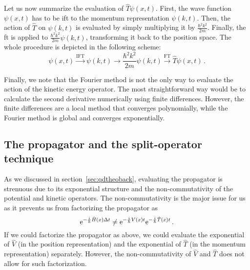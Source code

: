 Let us now summarize the evaluation of $\hat{T}\psi(x,t)$. First, the wave function $\psi(x,t)$ has to be \acrshort{ift} to the momentum representation $\psi(k,t)$. Then, the action of $\hat{T}$ on $\psi(k,t)$ is evaluated by simply multiplying it by $\frac{\hbar^2 k^2}{2m}$. Finally, the \acrshort{ft} is applied to $\frac{\hbar^2 k^2}{2m} \psi(k,t)$, transforming it back to the position space. The whole procedure is depicted in the following scheme:
\begin{equation}
    \psi(x,t) \stackrel{\mathrm{IFT}}{\longrightarrow} \psi(k,t) \longrightarrow \frac{\hbar^2 k^2}{2m} \psi(k,t) \stackrel{\mathrm{FT}}{\longrightarrow} \hat{T}\psi(x,t) \, .
\end{equation}

Finally, we note that the Fourier method is not the only way to evaluate the action of the kinetic energy operator. The most straightforward way would be to calculate the second derivative numerically using finite differences. However, the finite differences are a local method that converges polynomially, while the Fourier method is global and converges exponentially.

\subsection{The propagator and the split-operator technique}

As we discussed in section~\ref{sec:qdtheoback}, evaluating the propagator is strenuous due to its exponential structure and the non-commutativity of the potential and kinetic operators. The non-commutativity is the major issue for us as it prevents us from factorizing the propagator as
\begin{equation}
    \mathrm{e}^{-\frac{i}{\hbar}\hat{H}(x)\Delta t} \neq \mathrm{e}^{-\frac{i}{\hbar}V(x)t}\mathrm{e}^{-\frac{i}{\hbar}\hat{T}(x)t}\, .
\end{equation}
If we could factorize the propagator as above, we could evaluate the exponential of $\hat{V}$ (in the position representation) and the exponential of $\hat{T}$ (in the momentum representation) separately. However, the non-commutativity of $\hat{V}$ and $\hat{T}$ does not allow for such factorization.

